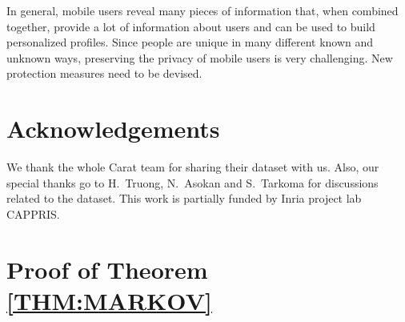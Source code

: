 \documentclass{acm_proc_article-sp}
\theoremstyle{plain}
\theoremstyle{plain}
\theoremstyle{plain}
\theoremstyle{plain}
\theoremstyle{plain}
\theoremstyle{plain}
\begin{document}
In general, mobile users reveal many pieces of information that, when combined together, provide a lot of information about users and can be used to build personalized profiles. 
Since people are unique in many different known and unknown ways, preserving the privacy of mobile users is very challenging. New protection measures need to be devised.












\section*{Acknowledgements}
We thank the whole Carat team for sharing their dataset with us. 
Also, our special thanks go to H.~Truong, N.~Asokan and S.~Tarkoma for discussions related to the dataset. 
This work is partially funded by Inria project lab CAPPRIS.






  

























\appendix

\section{Proof of Theorem \ref{THM:MARKOV}}
\label{sec:app}
\end{document}

